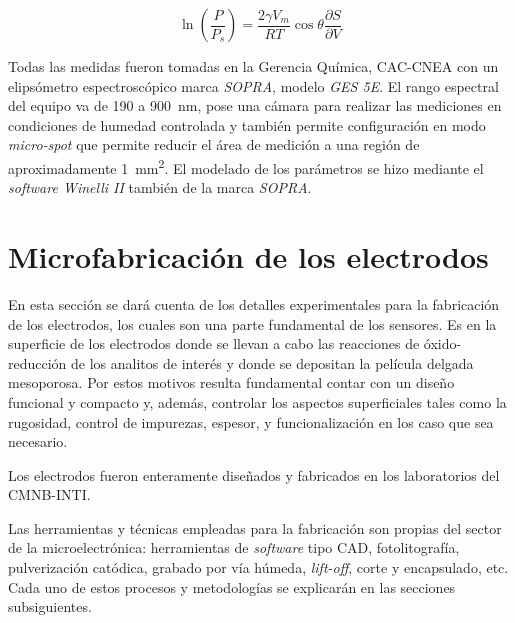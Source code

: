 			\begin{equation}
			  	 \ln \left(\frac{P}{P_s}\right)=\frac{2\gamma V_m}{RT} \cos{\theta}\frac{\partial S}{\partial V}
			     \label{eq:kelvin}
			 	 \end{equation}					
	
		Todas las medidas fueron tomadas en la Gerencia Química, CAC-CNEA con un elipsómetro espectroscópico marca \textit{SOPRA}, modelo \textit{GES 5E}. El rango espectral del equipo va de 190 a \SI{900}{\nm}, pose una cámara para realizar las mediciones en condiciones de humedad controlada y también permite configuración en modo \textit{micro-spot} que permite reducir el área de medición a una región de aproximadamente \SI{1}{\mm^2}. El modelado de los parámetros se hizo mediante el \textit{software Winelli II} también de la marca \textit{SOPRA}.
			

\section{Microfabricación de los electrodos}
		
	 En esta sección se dará cuenta de los detalles experimentales para la fabricación de los electrodos, los cuales son una parte fundamental de los sensores. Es en la superficie de los electrodos donde se llevan a cabo las reacciones de óxido-reducción de los analitos de interés y donde se depositan la película delgada mesoporosa. Por estos motivos resulta fundamental contar con un diseño funcional y compacto y, además, controlar los aspectos superficiales tales como la rugosidad, control de impurezas, espesor, y funcionalización en los caso que sea necesario.

	 Los electrodos fueron enteramente diseñados y fabricados en los laboratorios del CMNB-INTI. 
		
	 Las herramientas y técnicas empleadas para la fabricación son propias del sector de la microelectrónica: herramientas de \textit{software} tipo CAD, fotolitografía, pulverización catódica, grabado por vía húmeda, \textit{lift-off}, corte y encapsulado, etc.\cite{Franssila2004,Jaeger2001} Cada uno de estos procesos y metodologías se explicarán en las secciones subsiguientes. 

